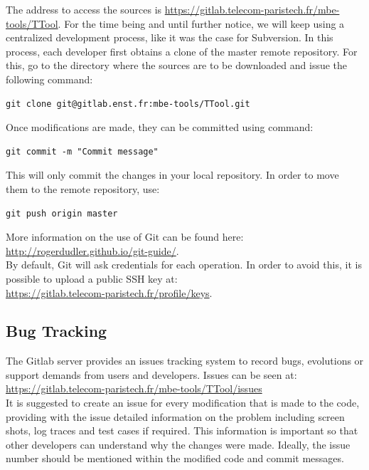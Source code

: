 \documentclass[12pt]{article}
\begin{document}
The address to access the sources is \url{https://gitlab.telecom-paristech.fr/mbe-tools/TTool}.
For the time being and until further notice, we will keep using a centralized development process, like it was the case for Subversion. In this process, each developer first obtains a clone of the master remote repository. For this, go to the directory where the sources are to be downloaded and issue the following command: \\


\begin{verbatim}
git clone git@gitlab.enst.fr:mbe-tools/TTool.git
\end{verbatim}

Once modifications are made, they can be committed using command:

\begin{verbatim}
git commit -m "Commit message"
\end{verbatim}

This will only commit the changes in your local repository. In order to move them to the remote repository, use:

\begin{verbatim}
git push origin master
\end{verbatim}

More information on the use of Git can be found here: \\
\url{http://rogerdudler.github.io/git-guide/}. \\

By default, Git will ask credentials for each operation. In order to avoid this,
it is possible to upload a public SSH key at: \\
\url{https://gitlab.telecom-paristech.fr/profile/keys}.

\subsection{Bug Tracking}

The Gitlab server provides an issues tracking system to record bugs, evolutions
or support demands from users and developers. Issues can be seen at: \\
\url{https://gitlab.telecom-paristech.fr/mbe-tools/TTool/issues} \\

It is suggested to create an issue for every modification that is made to the
code, providing with the issue detailed information on the problem including
screen shots, log traces and test cases if required. This information is
important so that other developers can understand why the changes were made.
Ideally, the issue number should be mentioned within the modified code and
commit messages.  \\
\end{document}
